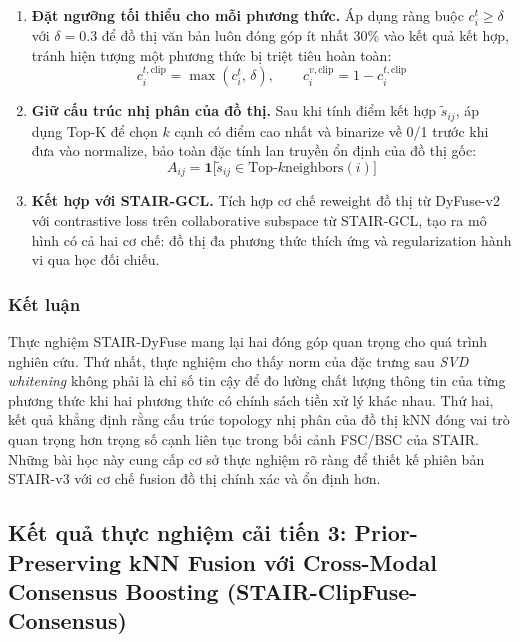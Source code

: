 \begin{longtable}
\begin{enumerate}[leftmargin=*, label=\textbf{\arabic*.}]
    \item \textbf{Đặt ngưỡng tối thiểu cho mỗi phương thức.} Áp dụng ràng buộc $c_i^t \geq \delta$ với $\delta = 0.3$ để đồ thị văn bản luôn đóng góp ít nhất 30\% vào kết quả kết hợp, tránh hiện tượng một phương thức bị triệt tiêu hoàn toàn:
    \begin{equation}
        c_i^{t,\text{clip}} = \max(c_i^t,\, \delta), \qquad c_i^{v,\text{clip}} = 1 - c_i^{t,\text{clip}}
    \end{equation}
 
    \item \textbf{Giữ cấu trúc nhị phân của đồ thị.} Sau khi tính điểm kết hợp $\tilde{s}_{ij}$, áp dụng Top-K để chọn $k$ cạnh có điểm cao nhất và binarize về 0/1 trước khi đưa vào normalize, bảo toàn đặc tính lan truyền ổn định của đồ thị gốc:
    \begin{equation}
        A_{ij} = \mathbf{1}\bigl[\tilde{s}_{ij} \in \text{Top-}k\text{neighbors}(i)\bigr]
    \end{equation}
 
    \item \textbf{Kết hợp với STAIR-GCL.} Tích hợp cơ chế reweight đồ thị từ DyFuse-v2 với contrastive loss trên collaborative subspace từ STAIR-GCL, tạo ra mô hình có cả hai cơ chế: đồ thị đa phương thức thích ứng và regularization hành vi qua học đối chiếu.
\end{enumerate}
 
\subsubsection{Kết luận}
 
Thực nghiệm STAIR-DyFuse mang lại hai đóng góp quan trọng cho quá trình nghiên cứu. Thứ nhất, thực nghiệm cho thấy norm của đặc trưng sau \textit{SVD whitening} không phải là chỉ số tin cậy để đo lường chất lượng thông tin của từng phương thức khi hai phương thức có chính sách tiền xử lý khác nhau. Thứ hai, kết quả khẳng định rằng cấu trúc topology nhị phân của đồ thị kNN đóng vai trò quan trọng hơn trọng số cạnh liên tục trong bối cảnh FSC/BSC của STAIR. Những bài học này cung cấp cơ sở thực nghiệm rõ ràng để thiết kế phiên bản STAIR-v3 với cơ chế fusion đồ thị chính xác và ổn định hơn.



\subsection{Kết quả thực nghiệm cải tiến 3: Prior-Preserving kNN Fusion với Cross-Modal Consensus Boosting (STAIR-ClipFuse-Consensus)}
 

\end{longtable}
